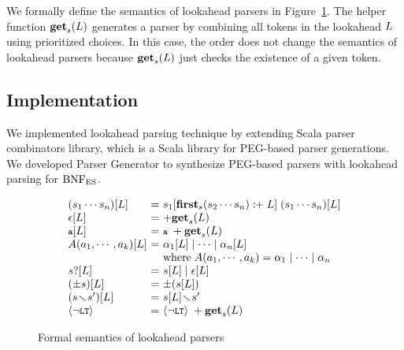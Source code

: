We formally define the semantics of lookahead parsers in Figure~\ref{fig:laparser}.
The helper function \( \textbf{get}_s(L) \) generates a parser by combining all
tokens in the lookahead \( L \) using prioritized choices.
In this case, the order does not change the semantics of lookahead parsers
because \( \textbf{get}_s(L) \) just checks the existence of a given token.

\subsection{Implementation}\label{sec:convert-bnfes}
We implemented lookahead parsing technique by extending Scala parser combinators
library, which is a Scala library for PEG-based parser generations.  We
developed {\sf Parser Generator} to synthesize PEG-based parsers with
lookahead parsing for \( \text{BNF}_{\text{ES}} \).

\begin{figure}[t]
\centering
\small
\[
  \begin{array}{l@{~}c@{~}l}
    (\symb_1 \cdots \symb_n)[\la] &=&
    \symb_1[\symbfirst{\symb_2 \cdots \symb_n} \firstplus \la] \;
    (\symb_1 \cdots \symb_n)[\la]\\
    \epsilon[\la] &=& +\getlap{\la}\\
    \T{a}[\la] &=& \T{a} \; +\getlap{\la} \\
    \NT{A}(\argument_1, \cdots, \argument_k)[\la] &=&
    \rhs_1[\la] \mid \cdots \mid \rhs_n[\la]\\
    && \text{where} \; \NT{A}(\argument_1, \cdots, \argument_k) =
    \rhs_1 \mid \cdots \mid \rhs_n\\

    \symb?[\la] &=& \symb[\la] \mid \epsilon[\la]\\
    (\pm\symb)[\la] &=& \pm(\symb[\la]) \\
    (\symb \butnot \symb')[\la] &=& \symb[\la] \butnot \symb'\\
    \nolt &=& \nolt \; +\getlap{\la}\\
  \end{array}
\]
\vspace*{-1em}
\caption{Formal semantics of lookahead parsers}
\label{fig:laparser}
\vspace*{-1em}
\end{figure}

\smallskip

